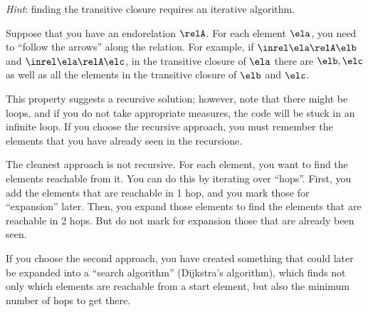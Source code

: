 
\emph{Hint}: finding the transitive closure requires an iterative algorithm.

Suppose that you have an endorelation $\relA$. For each element $\ela$, you need to ``follow the arrows'' along the relation. For example, if  $\inrel \ela \relA \elb$ and  $\inrel \ela \relA \elc$, in the transitive closure of $\ela$ there are $\elb, \elc$ as well as all the elements in the transitive closure of $\elb$ and $\elc$. 

This property suggests a recursive solution; however, note that there might be loops, and if you do not take appropriate measures, the code will be stuck in an infinite loop. If you choose the recursive approach, you must remember the elements that you have already seen in the recursione.

The cleanest approach is not recursive. For each element, you want to find the elements reachable from it. You can do this by iterating over ``hops''. First, you add the elements that are reachable in 1 hop, and you mark those for ``expansion'' later. Then, you expand those elements to find the elements that are reachable in 2 hops. But do not mark for expansion those that are already been seen. 

If you choose the second approach, you have created something that could later be expanded into a ``search algorithm'' (Dijkstra's algorithm), which finds not only which elements are reachable from a start element, but also the minimum number of hops to get there. 

